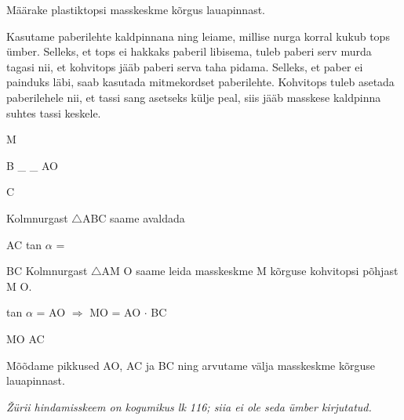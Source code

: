 
Määrake plastiktopsi masskeskme kõrgus lauapinnast.

\hint

\solu
Kasutame paberilehte kaldpinnana ning leiame, millise nurga korral kukub tops ümber. Selleks, et tops ei hakkaks paberil libisema, tuleb paberi serv murda tagasi nii, et kohvitops jääb paberi serva taha pidama. Selleks, et paber ei painduks läbi, saab kasutada mitmekordset paberilehte. Kohvitops tuleb asetada paberilehele nii, et tassi sang asetseks külje peal, siis jääb masskese kaldpinna suhtes tassi keskele.

M

B \_ \_ AO

C

Kolmnurgast $\triangle$ABC saame avaldada

AC tan $\alpha$ =

BC Kolmnurgast $\triangle$AM O saame leida masskeskme M kõrguse kohvitopsi põhjast M O.

tan $\alpha$ = AO $\Rightarrow$ MO = AO $\cdot$ BC

MO AC

Mõõdame pikkused AO, AC ja BC ning arvutame välja masskeskme kõrguse lauapinnast.

\textit{Žürii hindamisskeem on kogumikus lk 116; siia ei ole seda ümber kirjutatud.}
\probend
